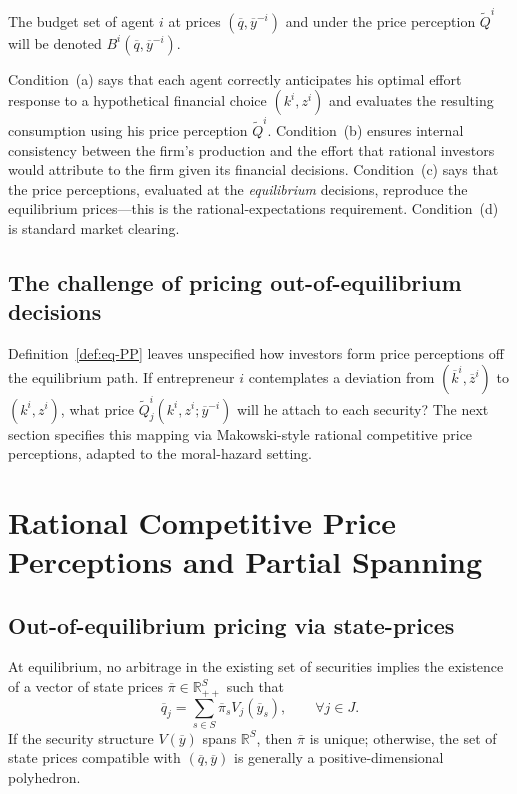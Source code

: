 \documentclass[11pt,a4paper,oneside]{book}
\def\R{\mathbb{R}}
\theoremstyle{plain}
\theoremstyle{definition}
\theoremstyle{remark}
\numberwithin{equation}{chapter}
\begin{document}
The budget set of agent $i$ at prices $(\overline{q}, \overline{y}^{-i})$ and under the price perception $\widetilde{Q}^i$ will be denoted $B^i(\overline{q}, \overline{y}^{-i})$.

Condition~(a) says that each agent correctly anticipates his optimal effort response to a hypothetical financial choice $(k^i, z^i)$ and evaluates the resulting consumption using his price perception $\widetilde{Q}^i$.
Condition~(b) ensures internal consistency between the firm's production and the effort that rational investors would attribute to the firm given its financial decisions.
Condition~(c) says that the price perceptions, evaluated at the \emph{equilibrium} decisions, reproduce the equilibrium prices---this is the rational-expectations requirement.
Condition~(d) is standard market clearing.

\subsection{The challenge of pricing out-of-equilibrium decisions}

Definition~\ref{def:eq-PP} leaves unspecified how investors form price perceptions off the equilibrium path.
If entrepreneur $i$ contemplates a deviation from $(\overline{k}^i, \overline{z}^i)$ to $(k^i, z^i)$, what price $\widetilde{Q}^i_j(k^i, z^i; \overline{y}^{-i})$ will he attach to each security?
The next section specifies this mapping via Makowski-style rational competitive price perceptions, adapted to the moral-hazard setting.

\section{Rational Competitive Price Perceptions and Partial Spanning}
\label{sec:RCPP}

\subsection{Out-of-equilibrium pricing via state-prices}

At equilibrium, no arbitrage in the existing set of securities implies the existence of a vector of state prices $\overline{\pi} \in \R_{++}^S$ such that
\begin{equation}\label{eq:state-prices}
  \overline{q}_j = \sum_{s \in S} \overline{\pi}_s V_j(\overline{y}_s),
  \qquad \forall j \in J.
\end{equation}
If the security structure $V(\overline{y})$ spans $\R^S$, then $\overline{\pi}$ is unique; otherwise, the set of state prices compatible with $(\overline{q}, \overline{y})$ is generally a positive-dimensional polyhedron.
\end{document}
